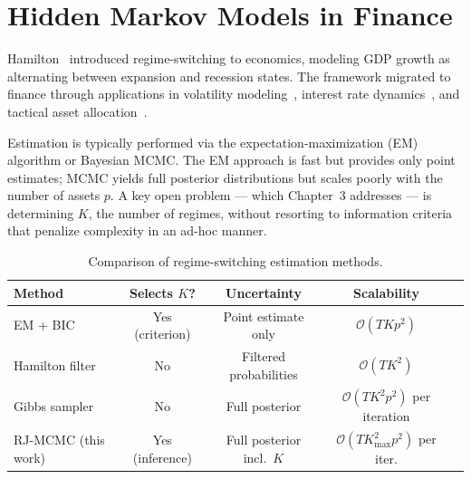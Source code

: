 \section{Hidden Markov Models in Finance}

Hamilton~\cite{hamilton1989} introduced regime-switching to economics, modeling GDP growth as alternating between expansion and recession states. The framework migrated to finance through applications in volatility modeling~\cite{timmermann2000}, interest rate dynamics~\cite{ang2002}, and tactical asset allocation~\cite{guidolin2007}.

Estimation is typically performed via the expectation-maximization (EM) algorithm or Bayesian MCMC. The EM approach is fast but provides only point estimates; MCMC yields full posterior distributions but scales poorly with the number of assets $p$. A key open problem --- which Chapter~3 addresses --- is determining $K$, the number of regimes, without resorting to information criteria that penalize complexity in an ad-hoc manner.

\begin{table}[H]
\centering
\caption{Comparison of regime-switching estimation methods.}
\label{tab:methods}
\begin{tabularx}{0.92\textwidth}{@{}l c c c X@{}}
\toprule
\textbf{Method} & \textbf{Selects $K$?} & \textbf{Uncertainty} & \textbf{Scalability} \\
\midrule
EM + BIC           & Yes (criterion) & Point estimate only         & $\mathcal{O}(T K p^2)$                  \\{}
Hamilton filter     & No              & Filtered probabilities      & $\mathcal{O}(T K^2)$                    \\{}
Gibbs sampler       & No              & Full posterior              & $\mathcal{O}(T K^2 p^2)$ per iteration  \\{}
RJ-MCMC (this work) & Yes (inference) & Full posterior incl.\ $K$   & $\mathcal{O}(T K_{\max}^2 p^2)$ per iter. \\
\bottomrule
\end{tabularx}
\end{table}
